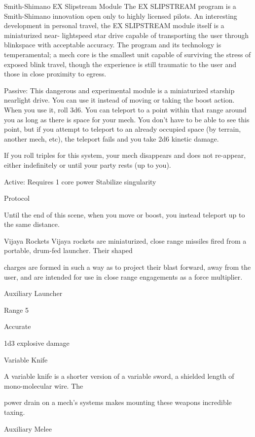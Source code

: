                                      Smith-Shimano EX Slipstream Module
   The EX SLIPSTREAM program is a Smith-Shimano innovation open only to highly licensed pilots. An
  interesting development in personal travel, the EX SLIPSTREAM module itself is a miniaturized near-
  lightspeed star drive capable of transporting the user through blinkspace with acceptable accuracy. The
  program and its technology is temperamental; a mech core is the smallest unit capable of surviving the
  stress of exposed blink travel, though the experience is still traumatic to the user and those in close
  proximity to egress.

   Passive:
  This dangerous and experimental module is a miniaturized starship nearlight drive. You can use it
   instead of moving or taking the boost action. When you use it, roll 3d6. You can teleport to a point
  within that range around you as long as there is space for your mech. You don’t have to be able to see
  this point, but if you attempt to teleport to an already occupied space (by terrain, another mech, etc),
  the teleport fails and you take 2d6 kinetic damage.


   If you roll triples for this system, your mech disappears and does not re-appear, either indefinitely or
   until your party rests (up to you).


  Active: Requires 1 core power
  Stabilize singularity

   Protocol

   Until the end of this scene, when you move or boost, you instead teleport up to the same distance.

Vijaya Rockets
Vijaya rockets are miniaturized, close range missiles fired from a portable, drum-fed launcher. Their shaped

charges are formed in such a way as to project their blast forward, away from the user, and are intended for
use in close range engagements as a force multiplier.

Auxiliary Launcher

Range 5

Accurate

1d3 explosive damage


Variable Knife

A variable knife is a shorter version of a variable sword, a shielded length of mono-molecular wire. The

power drain on a mech’s systems makes mounting these weapons incredible taxing.

Auxiliary Melee

